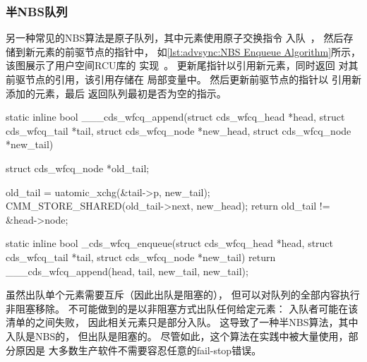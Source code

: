 \subsubsection{半NBS队列}
\label{sec:advsync:Half-NBS Queue}

\begin{fcvref}
另一种常见的NBS算法是原子队列，其中元素使用原子交换指令
入队~\cite{MagedMichael1993JPDC}，
然后存储到新元素的前驱节点的指针中，
如\cref{lst:advsync:NBS Enqueue Algorithm}所示，
该图展示了用户空间RCU库的
实现~\cite{MathieuDesnoyers2009URCU}。
更新尾指针以引用新元素，同时返回
对其前驱节点的引用，该引用存储在
局部变量中。
然后更新前驱节点的指针以
引用新添加的元素，最后
返回队列最初是否为空的指示。

\begin{listing}
\begin{fcvlabel}
\begin{VerbatimL}[commandchars=\\\[\]]
static inline bool
___cds_wfcq_append(struct cds_wfcq_head *head,
                   struct cds_wfcq_tail *tail,
                   struct cds_wfcq_node *new_head,
                   struct cds_wfcq_node *new_tail)
{
	struct cds_wfcq_node *old_tail;

	old_tail = uatomic_xchg(&tail->p, new_tail);	\lnlbl[tail]
	CMM_STORE_SHARED(old_tail->next, new_head);     \lnlbl[pred]
	return old_tail != &head->node;			\lnlbl[ret]
}

static inline bool
_cds_wfcq_enqueue(struct cds_wfcq_head *head,
                  struct cds_wfcq_tail *tail,
                  struct cds_wfcq_node *new_tail)
{
	return ___cds_wfcq_append(head, tail,
	                          new_tail, new_tail);
}
\end{VerbatimL}
\end{fcvlabel}
\caption{NBS入队算法}
\label{lst:advsync:NBS Enqueue Algorithm}
\end{listing}

虽然出队单个元素需要互斥（因此出队是阻塞的），
但可以对队列的全部内容执行非阻塞移除。
不可能做到的是以非阻塞方式出队任何给定元素：
入队者可能在该清单的之间失败，
因此相关元素只是部分入队。
这导致了一种半NBS算法，其中入队是NBS的，
但出队是阻塞的。
尽管如此，这个算法在实践中被大量使用，部分原因是
大多数生产软件不需要容忍任意的fail-stop错误。
\end{fcvref}

